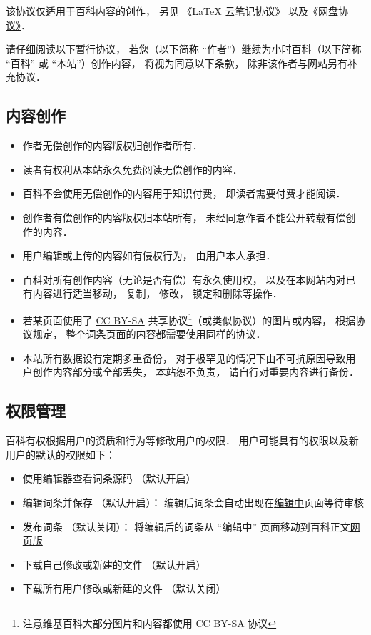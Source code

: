 
该协议仅适用于\href{http://wuli.wiki/online/}{百科内容}的创作， 另见 \href{http://wuli.wiki/online/NtLcns.html}{《LaTeX 云笔记协议》} 以及\href{http://www.example.com}{《网盘协议》}．

请仔细阅读以下暂行协议， 若您（以下简称 “作者”）继续为小时百科（以下简称 “百科” 或 “本站”）创作内容， 将视为同意以下条款， 除非该作者与网站另有补充协议．

\subsection{内容创作}
\begin{itemize}
\item 作者无偿创作的内容版权归创作者所有．
\item 读者有权利从本站永久免费阅读无偿创作的内容．
\item 百科不会使用无偿创作的内容用于知识付费， 即读者需要付费才能阅读．
\item 创作者有偿创作的内容版权归本站所有， 未经同意作者不能公开转载有偿创作的内容．
\item 用户编辑或上传的内容如有侵权行为， 由用户本人承担．
\item 百科对所有创作内容（无论是否有偿）有永久使用权， 以及在本网站内对已有内容进行适当移动， 复制， 修改， 锁定和删除等操作．
\item 若某页面使用了 \href{https://creativecommons.org/licenses/by-sa/3.0/}{CC BY-SA} 共享协议\footnote{注意维基百科大部分图片和内容都使用 CC BY-SA 协议}（或类似协议）的图片或内容， 根据协议规定， 整个词条页面的内容都需要使用同样的协议．
\item 本站所有数据设有定期多重备份， 对于极罕见的情况下由不可抗原因导致用户创作内容部分或全部丢失， 本站恕不负责， 请自行对重要内容进行备份．
\end{itemize}

\subsection{权限管理}
百科有权根据用户的资质和行为等修改用户的权限． 用户可能具有的权限以及新用户的默认的权限如下：
\begin{itemize}
\item 使用编辑器查看词条源码 （默认开启）
\item 编辑词条并保存 （默认开启）： 编辑后词条会自动出现在\href{http://wuli.wiki/changed}{编辑中}页面等待审核
\item 发布词条 （默认关闭）： 将编辑后的词条从 “编辑中” 页面移动到百科正文\href{http://wuli.wiki/online}{网页版}
\item 下载自己修改或新建的文件 （默认开启）
\item 下载所有用户修改或新建的文件 （默认关闭）
\end{itemize}

